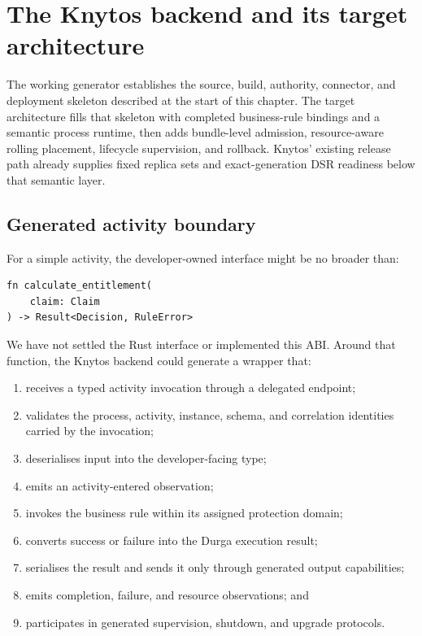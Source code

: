 \section{The Knytos backend and its target architecture}

The working generator establishes the source, build, authority, connector, and
deployment skeleton described at the start of this chapter. The target
architecture fills that skeleton with completed business-rule bindings and a
semantic process runtime, then adds bundle-level admission, resource-aware
rolling placement, lifecycle supervision, and rollback. Knytos' existing
release path already supplies fixed replica sets and exact-generation DSR
readiness below that semantic layer.

\subsection{Generated activity boundary}

For a simple activity, the developer-owned interface might be no broader than:

\begin{lstlisting}[style=rustCode]
fn calculate_entitlement(
    claim: Claim
) -> Result<Decision, RuleError>
\end{lstlisting}

We have not settled the Rust interface or implemented this ABI. Around that
function, the Knytos backend could generate a wrapper that:

\begin{enumerate}
    \item receives a typed activity invocation through a delegated endpoint;
    \item validates the process, activity, instance, schema, and correlation
        identities carried by the invocation;
    \item deserialises input into the developer-facing type;
    \item emits an activity-entered observation;
    \item invokes the business rule within its assigned protection domain;
    \item converts success or failure into the Durga execution result;
    \item serialises the result and sends it only through generated output
        capabilities;
    \item emits completion, failure, and resource observations; and
    \item participates in generated supervision, shutdown, and upgrade
        protocols.
\end{enumerate}

